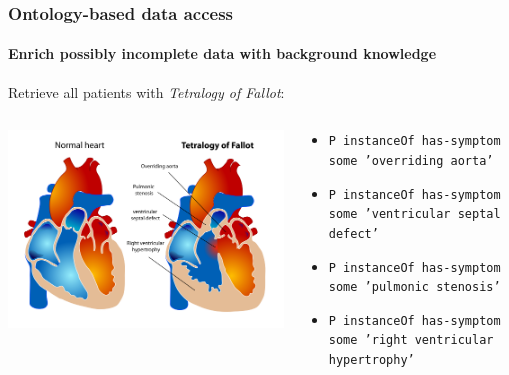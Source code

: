 \documentclass{beamer}
\renewcommand{\em}{\itshape}
\begin{document}
\begin{frame}
  \frametitle{Ontology-based data access} 
  \framesubtitle{Enrich possibly incomplete data with background
    knowledge}
  Retrieve all patients with {\em Tetralogy of Fallot}:
  \vspace{1cm}
  \begin{columns}[onlytextwidth]
    \begin{column}{.5\textwidth}
      \centerline{\includegraphics[width=1\textwidth]{tetralogy.png}}
    \end{column}
    \begin{column}{.5\textwidth}
      {\tiny
      \begin{itemize}
      \item {\tt P instanceOf has-symptom some 'overriding aorta'}
      \item {\tt P instanceOf has-symptom some 'ventricular septal defect'}
      \item {\tt P instanceOf has-symptom some 'pulmonic stenosis'}
      \item {\tt P instanceOf has-symptom some 'right ventricular hypertrophy'}
      \end{itemize}
}
    \end{column}
  \end{columns}
\end{frame}
\end{document}
